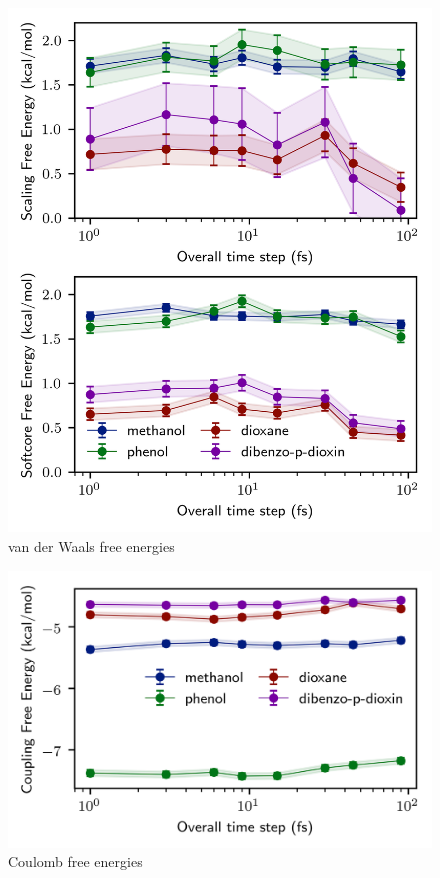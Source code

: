 \documentclass[
aip,
jcp,
reprint,
]{revtex4-1}
\begin{document}
\begin{figure}
	\centering
	\includegraphics{all_molecules_vdw_free_energies}
	\caption{van der Waals free energies}
	\label{fig:van der Waals free energies of all molecules}
\end{figure}

\begin{figure}
	\centering
	\includegraphics{all_molecules_coul_free_energies}
	\caption{Coulomb free energies}
	\label{fig:Coulomb free energies of all molecules}
\end{figure}
\end{document}
